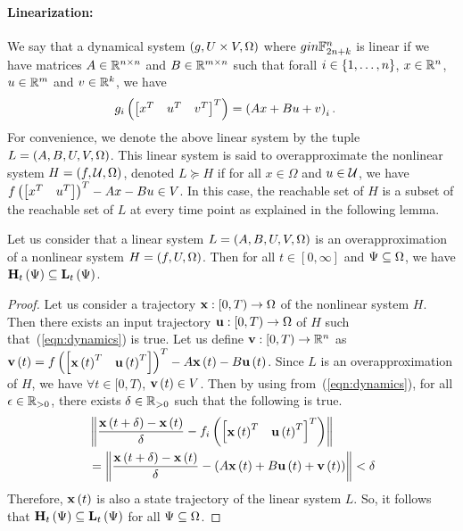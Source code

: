 \paragraph{Linearization:}  We say that a dynamical system
$\left(g,U\times V,\Omega\right)$ where $gin\mathbb{F}_{2n+k}^n$ is
linear if we have matrices $A\in\mathbb{R}^{n\times n}$ and
$B\in\mathbb{R}^{m\times n}$ such that forall $i\in\left\{1,\ldots,n\right\}$,
$x\in\mathbb{R}^n$, $u\in\mathbb{R}^m$ and $v\in\mathbb{R}^k$, we have
%
\begin{align*}
& g_i\left(\begin{bmatrix}x^T & u^T & v^T\end{bmatrix}^T\right) = \left(Ax + Bu + v\right)_i.
\end{align*}
%
For convenience, we denote the above linear system by the tuple $L
= \left(A,B,U,V,\Omega\right)$.  This linear system is said to overapproximate
the nonlinear system $H = \left(f,\mathcal{U},\Omega\right)$, denoted $L\succeq H$
if for all $x\in\Omega$ and $u\in\mathcal{U}$, we have $f\left(\begin{bmatrix}x^T
& u^T\end{bmatrix}\right)^T - Ax - Bu \in V$.  In this case, the reachable set of $H$ is
a subset of the reachable set of $L$ at every time point as explained
in the following lemma.
%
\begin{lemma}\label{lem:inclin}
Let us consider that a linear system $L = \left(A,B,U,V,\Omega\right)$ is an
overapproximation of a nonlinear system $H = \left(f,U,\Omega\right)$.  Then
for all $t\in[0,\infty]$ and $\Psi\subseteq\Omega$, we have
$\mathbf{H}_{t}\left(\Psi\right)\subseteq \mathbf{L}_{t}\left(\Psi\right)$.
\end{lemma}
%
\begin{proof}
Let us consider a trajectory $\mathbf{x}:[0,T)\rightarrow\Omega$ of the
nonlinear system $H$.  Then there exists an input trajectory
$\mathbf{u}:[0,T)\rightarrow\Omega$ of $H$ such
that~(\ref{eqn:dynamics}) is true.  Let us define
$\mathbf{v}:[0,T)\rightarrow \mathbb{R}^n$ as $\mathbf{v}\left(t\right) =
f\left(\begin{bmatrix}\mathbf{x}\left(t\right)^T & \mathbf{u}\left(t\right)^T\end{bmatrix}\right)^T - A\mathbf{x}\left(t\right) -
B\mathbf{u}\left(t\right)$.  Since $L$ is an overapproximation of $H$, we have
$\forall t\in[0,T)$, $\mathbf{v}\left(t\right)\in V$.  Then by using
from~(\ref{eqn:dynamics}), for all $\epsilon\in\mathbb{R}_{>0}$, there
exists $\delta\in\mathbb{R}_{>0}$ such that the following is true.
%
\begin{align*}
& \left\| \frac{ \mathbf{x}\left(t+\delta\right) - \mathbf{x}\left(t\right) }{\delta} -
f_i\left( \begin{bmatrix} \mathbf{x}\left(t\right)^T & \mathbf{u}\left(t\right)^T \end{bmatrix}^T \right)\right\|\\
& = \left\| \frac{ \mathbf{x}\left(t+\delta\right) - \mathbf{x}\left(t\right) }{\delta} -
\left(A\mathbf{x}\left(t\right) + B\mathbf{u}\left(t\right) + \mathbf{v}\left(t\right)\right) \right\| < \delta
\end{align*}
%
Therefore, $\mathbf{x}\left(t\right)$ is also a state trajectory of the linear system
$L$.  So, it follows that
$\mathbf{H}_{t}\left(\Psi\right)\subseteq \mathbf{L}_{t}\left(\Psi\right)$ for all
$\Psi\subseteq \Omega$.
\end{proof}
